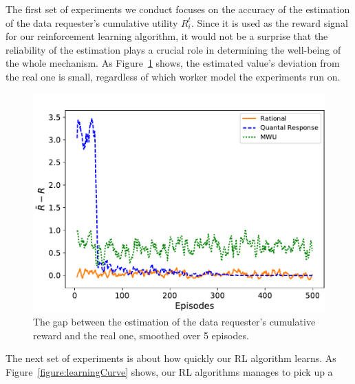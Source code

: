 The first set of experiments we conduct focuses on the accuracy of the estimation of the data requester's cumulative utility $R_i^t$. Since it is used as the reward signal for our reinforcement learning algorithm, it would not be a surprise that the reliability of the estimation plays a crucial role in determining the well-being of the whole mechanism. As Figure~\ref{figure:rewardError} shows, the estimated value's deviation from the real one is small, regardless of which worker model the experiments run on. 

\begin{figure}[t]
\centering
\includegraphics[scale=0.4]{image/rewardError}
\vspace{-2mm}
\caption{The gap between the estimation of the data requester's cumulative reward and the real one, smoothed over 5 episodes.}
\label{figure:rewardError}
\end{figure}

The next set of experiments is about how quickly our RL algorithm learns. As Figure~\ref{figure:learningCurve} shows, our RL algorithms manages to pick up a 

